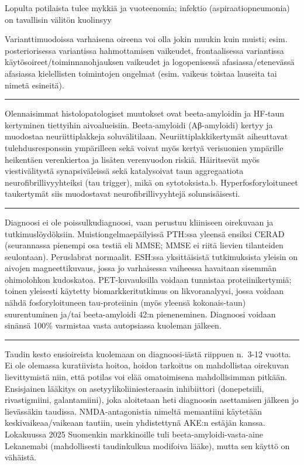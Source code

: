 \documentclass[
]{book}
\begin{document}
Lopulta potilaista tulee mykkiä ja vuoteenomia; infektio (aspiraatiopneumonia) on tavallisin välitön kuolinsyy

Varianttimuodoissa varhaisena oireena voi olla jokin muukin kuin muisti; esim. posteriorisessa variantissa hahmottamisen vaikeudet, frontaalisessa variantissa käytösoireet/toiminnanohjauksen vaikeudet ja logopenisessä afasiassa/etenevässä afasiassa kielellisten toimintojen ongelmat (esim. vaikeus toistaa lauseita tai nimetä esineitä).

\begin{center}\rule{0.5\linewidth}{0.5pt}\end{center}

Olennaisimmat histolopatologiset muutokset ovat beeta-amyloidin ja HF-taun kertyminen tiettyihin aivoalueisiin. Beeta-amyloidi (Aβ-amyloidi) kertyy ja muodostaa neuriittiplakkeja soluvälitilaan. Neuriittiplakkikertymät aiheuttavat tulehdusresponssin ympärilleen sekä voivat myös kertyä verisuonien ympärille heikentäen verenkiertoa ja lisäten verenvuodon riskiä. Häiritsevät myös viestivälitystä synapsiväleissä sekä katalysoivat taun aggregaatiota neurofibrillivyyhteiksi (tau trigger), mikä on sytotoksista.b. Hyperfosforyloituneet taukertymät siis muodostavat neurofibrillivyyhtejä solunsisäisesti.

\begin{center}\rule{0.5\linewidth}{0.5pt}\end{center}

Diagnoosi ei ole poissulkudiagnoosi, vaan perustuu kliiniseen oirekuvaan ja tutkimuslöydöksiin. Muistiongelmaepäilyissä PTH:ssa yleensä ensiksi CERAD (seurannassa pienempi osa testiä eli MMSE; MMSE ei riitä lievien tilanteiden seulontaan). Peruslabrat normaalit. ESH:ssa yksittäisistä tutkimuksista yleisin on aivojen magneettikuvaus, jossa jo varhaisessa vaiheessa havaitaan sisemmän ohimolohkon kudoskatoa. PET-kuvauksilla voidaan tunnistaa proteiinikertymiä; toinen yleisesti käytetty biomarkkeritutkimus on likvoranalyysi, jossa voidaan nähdä fosforyloituneen tau-proteiinin (myös yleensä kokonais-taun) suurentuminen ja/tai beeta-amyloidi 42:n pieneneminen. Diagnoosi voidaan sinänsä 100\% varmistaa vasta autopsiassa kuoleman jälkeen.

\begin{center}\rule{0.5\linewidth}{0.5pt}\end{center}

Taudin kesto ensioireista kuolemaan on diagnoosi-iästä riippuen n.~3-12 vuotta. Ei ole olemassa kuratiivista hoitoa, hoidon tarkoitus on mahdollistaa oirekuvan lievittymistä niin, että potilas voi elää omatoimisena mahdollisimman pitkään. Ensisjainen lääkitys on asetyylikoliiniesteraasin inhibiittori (donepetsiili, rivastigmiini, galantamiini), joka aloitetaan heti diagnoosin asettamisen jälkeen jo lievässäkin taudissa. NMDA-antagonistia nimeltä memantiini käytetään keskivaikeaa/vaikeaan tautiin, usein yhdistettynä AKE:n estäjän kanssa. Lokakuussa 2025 Suomenkin markkinoille tuli beeta-amyloidi-vasta-aine Lekanemabi (mahdollisesti taudinkulkua modifoiva lääke), mutta sen käyttö on vähäistä.
\end{document}
